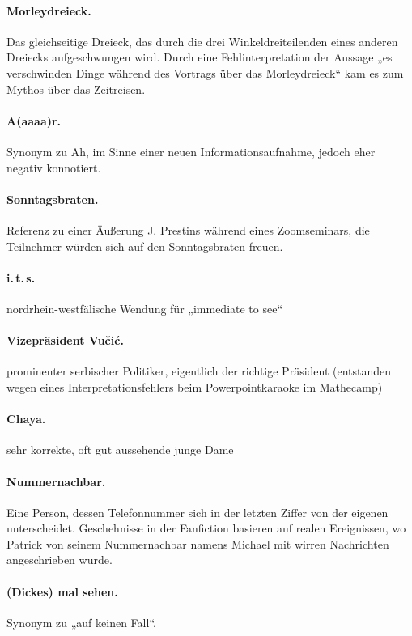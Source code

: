 \documentclass[oneside]{memoir}
\begin{document}
\paragraph{Morleydreieck.} Das gleichseitige Dreieck, das durch die drei Winkeldreiteilenden eines anderen Dreiecks aufgeschwungen wird. Durch eine Fehlinterpretation der Aussage „es verschwinden Dinge während des Vortrags  über das Morleydreieck“ kam es zum Mythos über das Zeitreisen.

\paragraph{A(aaaa)r.} Synonym zu Ah, im Sinne einer neuen Informationsaufnahme, jedoch eher negativ konnotiert.

\paragraph{Sonntagsbraten.} Referenz zu einer Äußerung J. Prestins während eines Zoomseminars, die Teilnehmer würden sich auf den Sonntagsbraten freuen.

\paragraph{i.\,t.\,s.} nordrhein-westfälische Wendung für „immediate to see“

\paragraph{Vizepräsident Vučić.} prominenter serbischer Politiker, eigentlich der richtige Präsident (entstanden wegen eines Interpretationsfehlers beim Powerpointkaraoke im Mathecamp)

\paragraph{Chaya.} sehr korrekte, oft gut aussehende junge Dame

\paragraph{Nummernachbar.} Eine Person, dessen Telefonnummer sich in der letzten Ziffer von der eigenen unterscheidet. Geschehnisse in der Fanfiction basieren auf realen Ereignissen, wo Patrick von seinem Nummernachbar namens Michael mit wirren Nachrichten angeschrieben wurde.

\paragraph{(Dickes) mal sehen.} Synonym zu „auf keinen Fall“.
\end{document}
